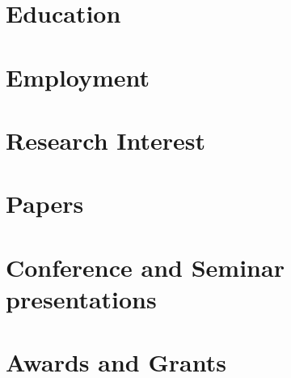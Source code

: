 \documentclass{prometheus_cv}
\begin{document}
\thispagestyle{empty}					%
\pagestyle{fancy}			 		%

\vspace*{-1cm}
\centering 


\vspace*{0.4cm}
\section{Education}


\vspace*{0.4cm}
\section{Employment}



\section{Research Interest}


\section{Papers}


\section{Conference and Seminar presentations}



\section{Awards and Grants}

\end{document}
